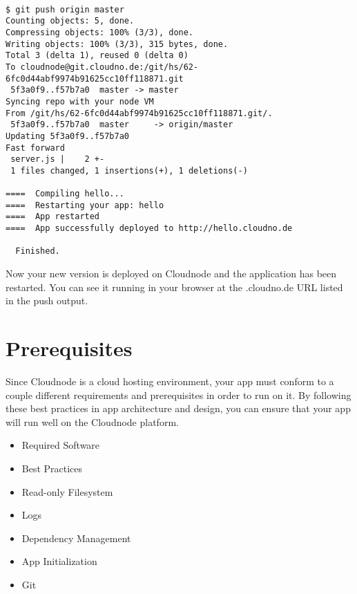 \begin{adjustwidth}{2.5em}{2.5em}
\begin{verbatim}

$ git push origin master
Counting objects: 5, done.
Compressing objects: 100% (3/3), done.
Writing objects: 100% (3/3), 315 bytes, done.
Total 3 (delta 1), reused 0 (delta 0)
To cloudnode@git.cloudno.de:/git/hs/62-6fc0d44abf9974b91625cc10ff118871.git
 5f3a0f9..f57b7a0  master -> master
Syncing repo with your node VM
From /git/hs/62-6fc0d44abf9974b91625cc10ff118871.git/.
 5f3a0f9..f57b7a0  master     -> origin/master
Updating 5f3a0f9..f57b7a0
Fast forward
 server.js |    2 +-
 1 files changed, 1 insertions(+), 1 deletions(-)

====  Compiling hello...
====  Restarting your app: hello
====  App restarted
====  App successfully deployed to http://hello.cloudno.de

  Finished.

\end{verbatim}
\end{adjustwidth}

Now your new version is deployed on Cloudnode and the application has been restarted. You can see it running in your browser at the .cloudno.de URL listed in the push output.

\chapter{Prerequisites}
\label{prerequisites}

Since Cloudnode is a cloud hosting environment, your app must conform to a couple different requirements and prerequisites in order to run on it. By following these best practices in app architecture and design, you can ensure that your app will run well on the Cloudnode platform.

\begin{itemize}
\item Required Software

\item Best Practices

\item Read-only Filesystem

\item Logs

\item Dependency Management

\item App Initialization

\item Git

\end{itemize}



